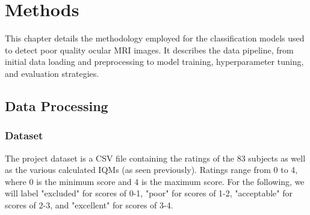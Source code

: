 \chapter{Methods}
\label{chap:methods}

This chapter details the methodology employed for the classification models used to detect poor quality ocular MRI images. It describes the data pipeline, from initial data loading and preprocessing to model training, hyperparameter tuning, and evaluation strategies.

\section{Data Processing}
\label{sec:data_processing}

\subsection{Dataset}
\label{ssec:data_acquisition_methods} %
The project dataset is a CSV file containing the ratings of the 83 subjects as well as the various calculated IQMs (as seen previously). Ratings range from 0 to 4, where 0 is the minimum score and 4 is the maximum score. For the following, we will label "excluded" for scores of 0-1, "poor" for scores of 1-2, "acceptable" for scores of 2-3, and "excellent" for scores of 3-4.



